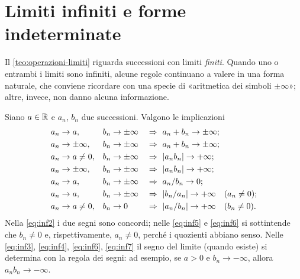 \section{Limiti infiniti e forme indeterminate}
\label{sec:forme-indeterminate}

Il \cref{teo:operazioni-limiti} riguarda successioni con limiti \emph{finiti}. Quando
uno o entrambi i limiti sono infiniti, alcune regole continuano a valere in una forma
naturale, che conviene ricordare con una specie di «aritmetica dei simboli $\pm\infty$»;
altre, invece, non danno alcuna informazione.

\begin{teorema}\label{teo:operazioni-infinite}
Siano $a\in\mathbb{R}$ e $a_{n}$, $b_{n}$ due successioni. Valgono le implicazioni
\begin{align}
  &a_{n}\to a, &&b_{n}\to\pm\infty &&\implica\ a_{n}+b_{n}\to\pm\infty; \label{eq:inf1}\\
  &a_{n}\to\pm\infty, &&b_{n}\to\pm\infty &&\implica\ a_{n}+b_{n}\to\pm\infty; \label{eq:inf2}\\
  &a_{n}\to a\neq0, &&b_{n}\to\pm\infty &&\implica\ \abs{a_{n}b_{n}}\to+\infty; \label{eq:inf3}\\
  &a_{n}\to\pm\infty, &&b_{n}\to\pm\infty &&\implica\ \abs{a_{n}b_{n}}\to+\infty; \label{eq:inf4}\\
  &a_{n}\to a, &&b_{n}\to\pm\infty &&\implica\ a_{n}/b_{n}\to0; \label{eq:inf5}\\
  &a_{n}\to a, &&b_{n}\to\pm\infty &&\implica\ \abs{b_{n}/a_{n}}\to+\infty \quad(a_{n}\neq0); \label{eq:inf6}\\
  &a_{n}\to a\neq0, &&b_{n}\to0 &&\implica\ \abs{a_{n}/b_{n}}\to+\infty \quad(b_{n}\neq0). \label{eq:inf7}
\end{align}
Nella \eqref{eq:inf2} i due segni sono concordi; nelle \eqref{eq:inf5} e
\eqref{eq:inf6} si sottintende che $b_{n}\neq0$ e, rispettivamente, $a_{n}\neq0$, perché i
quozienti abbiano senso. Nelle \eqref{eq:inf3}, \eqref{eq:inf4}, \eqref{eq:inf6},
\eqref{eq:inf7} il segno del limite (quando esiste) si determina con la regola dei segni:
ad esempio, se $a>0$ e $b_{n}\to-\infty$, allora $a_{n}b_{n}\to-\infty$.
\end{teorema}

\begin{schema}
\end{schema}

